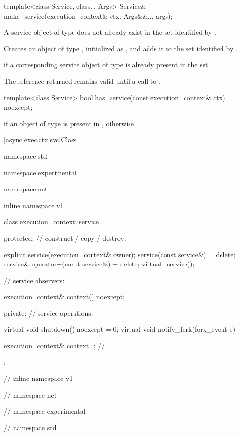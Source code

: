 %
\begin{itemdecl}
template<class Service, class... Args> Service&
  make_service(execution_context& ctx, Args&&... args);
\end{itemdecl}

\begin{itemdescr}
\pnum
\requires A service object of type  does not already exist in the  set identified by .

\pnum
\effects Creates an object of type , initialized as , and adds it to the  set identified by .

\pnum
\throws {} if a corresponding service object of type  is already present in the set.

\pnum
\remarks The reference returned remains valid until a call to .
\end{itemdescr}

%
\begin{itemdecl}
template<class Service> bool has_service(const execution_context& ctx) noexcept;
\end{itemdecl}

\begin{itemdescr}
\pnum
\returns {} if an object of type  is present in , otherwise .
\end{itemdescr}




[async.exec.ctx.svc]{Class }

%
\begin{codeblock}
namespace std {
namespace experimental {
namespace net {
inline namespace v1 {

  class execution_context::service
  {
  protected:
    // construct / copy / destroy:

    explicit service(execution_context& owner);
    service(const service&) = delete;
    service& operator=(const service&) = delete;
    virtual ~service();

    // service observers:

    execution_context& context() noexcept;

  private:
    // service operations:

    virtual void shutdown() noexcept = 0;
    virtual void notify_fork(fork_event e) {}

    execution_context& context_; // \expos
  };

} // inline namespace v1
} // namespace net
} // namespace experimental
} // namespace std
\end{codeblock}


